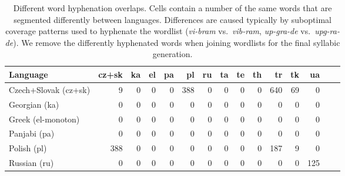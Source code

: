 \documentclass{csbulletin}
\newcommand{\word}[1]{\textit{#1}\xspace}
\begin{document}
\begin{table}[tbh]
\centering
\caption{Different word hyphenation overlaps.
Cells contain a number of the same words that are segmented differently between languages.
Differences are caused typically by suboptimal coverage patterns used to hyphenate the wordlist (\word{vi-bram} vs.\ \word{vib-ram}, 
\word{up-gra-de} vs.\ \word{upg-ra-de}).
We remove the differently hyphenated words when joining wordlists for the final syllabic generation.}
\label{tab:colisions}
\smallskip 
\begin{tabular}{lrrrrrrrrrrrrrr}
\toprule
Language & cz+sk & ka & el & pa & pl & ru %
& ta & te & th & tr & tk & ua 
\\ \midrule
Czech+Slovak (cz+sk)  %
  & 9 %
  & 0 %
  & 0 %
  & 0 %
  & 388%
  & 0 %
  & 0 %
  & 0%
  & 0 %
  & 640 %
  & 69 %
  & 0 %
  \\
Georgian (ka)   %
  & 0 %
  & 0%
  & 0%
  & 0%
  & 0%
  & 0%
  & 0%
  & 0%
  & 0%
  & 0%
  & 0%
  & 0%
  \\ 
Greek (el-monoton) %
  & 0 %
  & 0%
  & 0%
  & 0%
  & 0%
  & 0%
  & 0%
  & 0%
  & 0%
  & 0%
  & 0%
  & 0%
  \\
Panjabi (pa)  %
  & 0%
  & 0%
  & 0%
  & 0%
  & 0%
  & 0%
  & 0%
  & 0%
  & 0%
  & 0%
  & 0%
  & 0%
  \\
Polish (pl) %
  & 388%
  & 0%
  & 0%
  & 0%
  & 0%
  & 0%
  & 0%
  & 0%
  & 0%
  & 187%
  & 9%
  & 0%
  \\
Russian (ru) %
  & 0%
  & 0%
  & 0%
  & 0%
  & 0%
  & 0%
  & 0%
  & 0%
  & 0%
  & 0%
  & 0%
  & 125%
  \\

\end{tabular}
\end{table}
\end{document}
